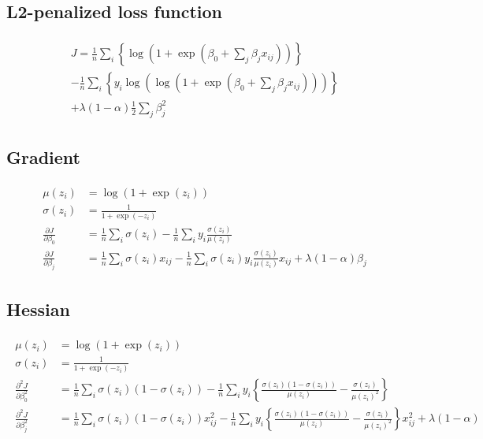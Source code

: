 \documentclass[a4paper]{article}
\begin{document}
\subsection{L2-penalized loss function}
\def \poissonloss{
\begin{align}
\begin{split}
J = \frac{1}{n}\sum_i \left\{ \log( 1 + \exp( \beta_0 + \sum_j \beta_j x_{ij} ) ) \right\} \\
- \frac{1}{n}\sum_i \left\{ y_i \log( \log( 1 + \exp(\beta_0 + \sum_j \beta_j x_{ij} ) ) ) \right\} \\
+ \lambda (1-\alpha) \frac{1}{2} \sum_j \beta_j^2
\end{split}
\end{align}}
\poissonloss

\subsection{Gradient}
\def \poissongrad{
\begin{align}
\begin{split}
\mu(z_i) &= \log(1 + \exp(z_i)) \\
\sigma(z_i) &= \frac{1}{1 + \exp(-z_i)} \\
\frac{\partial J}{\partial \beta_0} &= \frac{1}{n}\sum_i \sigma(z_i) - \frac{1}{n}\sum_i y_i \frac{\sigma(z_i)}{\mu(z_i)} \\
\frac{\partial J}{\partial \beta_j} &= \frac{1}{n}\sum_i \sigma(z_i) x_{ij} - \frac{1}{n}\sum_i \sigma(z_i) y_i \frac{\sigma(z_i)}{\mu(z_i)}x_{ij} + \lambda (1 - \alpha) \beta_j
\end{split}
\end{align}}
\poissongrad

\subsection{Hessian}
\def \poissonhess{
\begin{align}
\begin{split}
\mu(z_i) &= \log(1 + \exp(z_i)) \\
\sigma(z_i) &= \frac{1}{1 + \exp(-z_i)} \\
\frac{\partial^2 J}{\partial \beta_0^2} &= \frac{1}{n}\sum_i \sigma(z_i) (1 - \sigma(z_i)) 
- \frac{1}{n}\sum_i y_i \left\{ \frac{\sigma(z_i) (1 - \sigma(z_i))}{\mu(z_i)} - \frac{\sigma(z_i)}{\mu(z_i)^2} \right\} \\
\frac{\partial^2 J}{\partial \beta_j^2} &=  \frac{1}{n}\sum_i \sigma(z_i) (1 - \sigma(z_i)) x_{ij}^2
- \frac{1}{n}\sum_i y_i \left\{ \frac{\sigma(z_i) (1 - \sigma(z_i))}{\mu(z_i)} - \frac{\sigma(z_i)}{\mu(z_i)^2} \right\} x_{ij}^2
+ \lambda (1 - \alpha)
\end{split}
\end{align}}
\poissonhess
\end{document}
